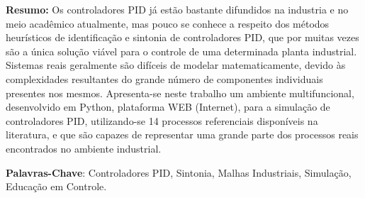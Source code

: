 \begin{resumo}

    \textbf{Resumo:} Os controladores \acs{PID} já estão bastante difundidos na industria e no
    meio acadêmico atualmente, mas pouco se conhece a respeito dos métodos
    heurísticos de identificação e sintonia de controladores \acs{PID},
    que por muitas vezes são a única solução viável para o controle de
    uma determinada planta industrial. Sistemas reais geralmente são difíceis
    de modelar matematicamente, devido às complexidades resultantes do
    grande número de componentes individuais presentes nos mesmos. Apresenta-se
    neste trabalho um ambiente multifuncional, desenvolvido em Python,
    plataforma WEB (Internet), para a simulação de controladores \acs{PID},
    utilizando-se 14 processos referenciais disponíveis na literatura, e
    que são capazes de representar uma grande parte dos processos reais
    encontrados no ambiente industrial.
    
    \textbf{Palavras-Chave}: Controladores PID, Sintonia, Malhas Industriais,
    Simulação, Educação em Controle.

\end{resumo}
